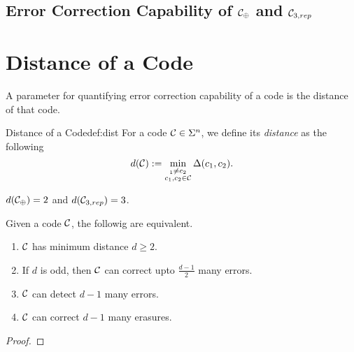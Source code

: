 \subsection{Error Correction Capability of $\mathcal{C}_\oplus$ and $\mathcal{C}_{3,rep}$}

\section{Distance of a Code}
A parameter for quantifying error correction capability of a code is the distance of that code.
\begin{definition}{Distance of a Code}{def:dist}
For a code $\mathcal{C}\in\Sigma^n$, we define its \textit{distance} as the following 
\[
d(\cC) := \min_{
	\begin{subarray}
		
		c_1\neq c_2 \\
		c_1, c_2\in\cC
\end{subarray}
} \Delta(c_1, c_2).
\]
\end{definition}
\begin{example}
	$d(\mathcal{C}_\oplus) = 2$ and $d(\mathcal{C}_{3,rep}) = 3$.
\end{example}

\begin{proposition}{}{}
	Given a code $\mathcal{C}$, the followig are equivalent.
	\begin{enumerate}
		\item $\mathcal{C}$ has minimum distance $d\geq 2$.
		\item If $d$ is odd, then $\mathcal{C}$ can correct upto $\frac{d-1}{2}$ many errors.
		\item $\mathcal{C}$ can detect $d-1$ many errors.
		\item $\mathcal{C}$ can correct $d-1$ many erasures.
	\end{enumerate}
\end{proposition}
\begin{proof}

\end{proof}
